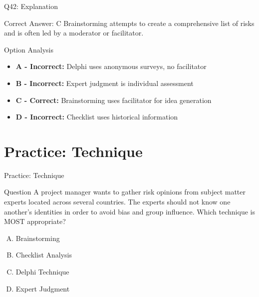\documentclass{beamer}
\begin{document}
	\begin{frame}{Q42: Explanation}
		\begin{block}{Correct Answer: C}
			Brainstorming attempts to create a comprehensive list of risks and is often led by a moderator or facilitator.
		\end{block}
		\begin{block}{Option Analysis}
			\begin{itemize}
				\item \textbf{A - Incorrect:} Delphi uses anonymous surveys, no facilitator
				\item \textbf{B - Incorrect:} Expert judgment is individual assessment
				\item \textbf{C - Correct:} Brainstorming uses facilitator for idea generation
				\item \textbf{D - Incorrect:} Checklist uses historical information
			\end{itemize}
		\end{block}
	\end{frame}
	
	
	
	
	
	
	\section{Practice:  Technique}
	
	\begin{frame}{Practice:  Technique}
		\begin{block}{Question}
			A project manager wants to gather risk opinions from subject matter experts located across several countries. The experts should not know one another's identities in order to avoid bias and group influence. Which technique is MOST appropriate?
		\end{block}
		\begin{enumerate}[(A)]
			\item Brainstorming
			\item Checklist Analysis
			\item Delphi Technique
			\item Expert Judgment
		\end{enumerate}
	\end{frame}
	
\end{document}

